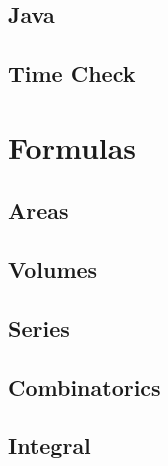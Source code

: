 \documentclass[10pt,a4paper]{report}
\begin{document}
	\section{Java}
	\newpage
	\section{Time Check}
		
	
\chapter{Formulas}
	\section{Areas}
	\section{Volumes}
	\section{Series}
	\section{Combinatorics}
	\section{Integral}
\end{document}
